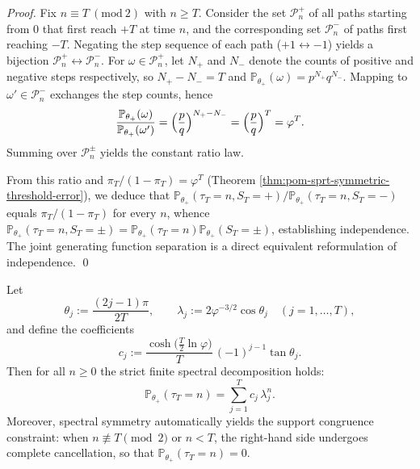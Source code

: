 \begin{proof}
Fix \(n\equiv T\ (\mathrm{mod}\ 2)\) with \(n\ge T\).
Consider the set \(\mathcal{P}_{n}^{+}\) of all paths starting from \(0\) that first reach \(+T\) at time \(n\), and the corresponding set \(\mathcal{P}_{n}^{-}\) of paths first reaching \(-T\).
Negating the step sequence of each path (\(+1\leftrightarrow -1\)) yields a bijection \(\mathcal{P}_{n}^{+}\leftrightarrow \mathcal{P}_{n}^{-}\).
For \(\omega\in\mathcal{P}_n^{+}\), let \(N_{+}\) and \(N_{-}\) denote the counts of positive and negative steps respectively, so \(N_{+}-N_{-}=T\) and
\(
\mathbb{P}_{\theta_+}(\omega)=p^{N_{+}}q^{N_{-}}
\).
Mapping to \(\omega'\in\mathcal{P}_n^{-}\) exchanges the step counts, hence
\[
\frac{\mathbb{P}_{\theta_+}(\omega)}{\mathbb{P}_{\theta_+}(\omega')}
=\Bigl(\frac{p}{q}\Bigr)^{N_{+}-N_{-}}
=\Bigl(\frac{p}{q}\Bigr)^{T}
=\varphi^{T}.
\]
Summing over \(\mathcal{P}_n^\pm\) yields the constant ratio law.
\par
From this ratio and
\(
\pi_T/(1-\pi_T)=\varphi^T
\)
(Theorem \ref{thm:pom-sprt-symmetric-threshold-error}),
we deduce that
\(
\mathbb{P}_{\theta_+}(\tau_T=n,S_T=+)/\mathbb{P}_{\theta_+}(\tau_T=n,S_T=-)
\)
equals \(\pi_T/(1-\pi_T)\) for every \(n\), whence
\(
\mathbb{P}_{\theta_+}(\tau_T=n,S_T=\pm)=\mathbb{P}_{\theta_+}(\tau_T=n)\mathbb{P}_{\theta_+}(S_T=\pm)
\), establishing independence.
The joint generating function separation is a direct equivalent reformulation of independence. \qed
\end{proof}

\begin{proposition}\label{prop:pom-tau-pmf-finite-spectral-decomposition}
Let
\[
\theta_j:=\frac{(2j-1)\pi}{2T},\qquad
\lambda_j:=2\varphi^{-3/2}\cos\theta_j\quad (j=1,\dots,T),
\]
and define the coefficients
\[
c_j:=\frac{\cosh\!\bigl(\tfrac{T}{2}\ln\varphi\bigr)}{T}\,(-1)^{j-1}\tan\theta_j.
\]
Then for all \(n\ge 0\) the strict finite spectral decomposition holds:
\[
\boxed{\;\mathbb{P}_{\theta_+}(\tau_T=n)=\sum_{j=1}^{T} c_j\,\lambda_j^{n}.\;}
\]
Moreover, spectral symmetry automatically yields the support congruence constraint: when \(n\not\equiv T\pmod 2\) or \(n<T\), the right-hand side undergoes complete cancellation, so that \(\mathbb{P}_{\theta_+}(\tau_T=n)=0\).
\end{proposition}

